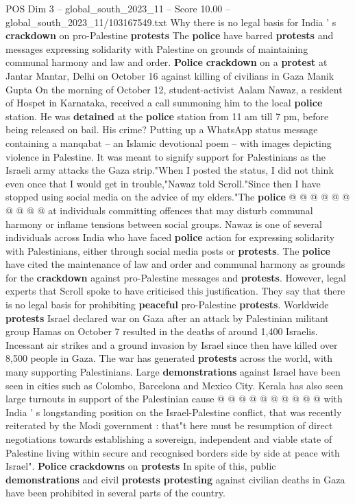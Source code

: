 \begin{textsample}{POS Dim 3 – global\_south\_2023\_11 – Score 10.00 – global\_south\_2023\_11/103167549.txt}  \label{ex:f3_pos_354}
Why there is no legal basis for India ' s \textbf{crackdown} on pro-Palestine \textbf{protests} The \textbf{police} have barred \textbf{protests} and messages expressing solidarity with Palestine on grounds of maintaining communal harmony and law and order. \textbf{Police} \textbf{crackdown} on a \textbf{protest} at Jantar Mantar, Delhi on October 16 against killing of civilians in Gaza Manik Gupta On the morning of October 12, student-activist Aalam Nawaz, a resident of Hospet in Karnataka, received a call summoning him to the local \textbf{police} station.
He was \textbf{detained} at the \textbf{police} station from 11 am till 7 pm, before being released on bail.
His crime?
Putting up a WhatsApp status message containing a manqabat -- an Islamic devotional poem -- with images depicting violence in Palestine.
It was meant to signify support for Palestinians as the Israeli army attacks the Gaza strip."When I posted the status, I did not think even once that I would get in trouble,"Nawaz told Scroll."Since then I have stopped using social media on the advice of my elders."The \textbf{police} @ @ @ @ @ @ @ @ @ @ at individuals committing offences that may disturb communal harmony or inflame tensions between social groups.
Nawaz is one of several individuals across India who have faced \textbf{police} action for expressing solidarity with Palestinians, either through social media posts or \textbf{protests}.
The \textbf{police} have cited the maintenance of law and order and communal harmony as grounds for the \textbf{crackdown} against pro-Palestine messages and \textbf{protests}.
However, legal experts that Scroll spoke to have criticised this justification.
They say that there is no legal basis for prohibiting \textbf{peaceful} pro-Palestine \textbf{protests}.
Worldwide \textbf{protests} Israel declared war on Gaza after an attack by Palestinian militant group Hamas on October 7 resulted in the deaths of around 1,400 Israelis.
Incessant air strikes and a ground invasion by Israel since then have killed over 8,500 people in Gaza.
The war has generated \textbf{protests} across the world, with many supporting Palestinians.
Large \textbf{demonstrations} against Israel have been seen in cities such as Colombo, Barcelona and Mexico City.
Kerala has also seen large turnouts in support of the Palestinian cause @ @ @ @ @ @ @ @ @ @ with India ' s longstanding position on the Israel-Palestine conflict, that was recently reiterated by the Modi government : that"t here must be resumption of direct negotiations towards establishing a sovereign, independent and viable state of Palestine living within secure and recognised borders side by side at peace with Israel". \textbf{Police} \textbf{crackdowns} on \textbf{protests} In spite of this, public \textbf{demonstrations} and civil \textbf{protests} \textbf{protesting} against civilian deaths in Gaza have been prohibited in several parts of the country.

\end{textsample}
